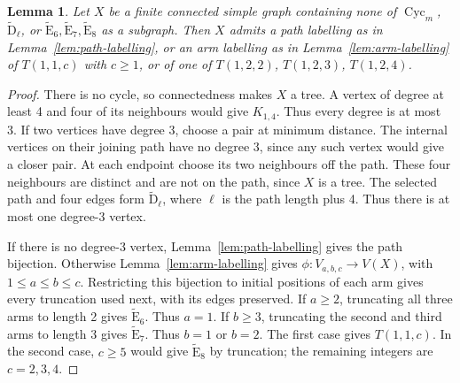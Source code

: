 \documentclass[11pt]{amsart}
\newcommand\opk[1]{\mathop{\mathrm{#1}}\nolimits}
\newtheorem{lemma}[theorem]{Lemma}
\theoremstyle{definition}
\newcommand{\typ}[1]{\mathrm{#1}}
\newcommand{\Cyc}{\opk{Cyc}}
\begin{document}
\begin{lemma}\label{lem:unweighted-trees}
Let $X$ be a finite connected simple graph containing none of
$\Cyc_m$, $\widetilde{\typ D}_\ell$, or
$\widetilde{\typ E}_6,\widetilde{\typ E}_7,\widetilde{\typ E}_8$ as a
subgraph. Then $X$ admits a path labelling as in
Lemma~\ref{lem:path-labelling}, or an arm labelling as in
Lemma~\ref{lem:arm-labelling} of $T(1,1,c)$ with $c\geq1$, or of
one of $T(1,2,2)$, $T(1,2,3)$, $T(1,2,4)$.
\end{lemma}
\begin{proof}
There is no cycle, so connectedness makes $X$ a tree. A vertex of degree
at least 4 and four of its neighbours would give $K_{1,4}$. Thus every
degree is at most 3. If two vertices have degree 3, choose a pair at
minimum distance. The internal vertices on their joining path have no
degree 3, since any such vertex would give a closer pair. At each endpoint
choose its two neighbours off the path. These four neighbours are distinct
and are not on the path, since $X$ is a tree. The selected path and four
edges form $\widetilde{\typ D}_\ell$, where $\ell$ is the path length
plus 4. Thus there is at most one degree-3 vertex.

If there is no degree-3 vertex, Lemma~\ref{lem:path-labelling} gives
the path bijection. Otherwise Lemma~\ref{lem:arm-labelling} gives
$\phi:V_{a,b,c}\to V(X)$, with $1\leq a\leq b\leq c$.
Restricting this bijection to initial positions of each arm gives every
truncation used next, with its edges preserved.
If $a\geq2$, truncating all three arms to length 2 gives
$\widetilde{\typ E}_6$. Thus $a=1$. If $b\geq3$, truncating the
second and third arms to length 3 gives $\widetilde{\typ E}_7$.
Thus $b=1$ or $b=2$. The first case gives $T(1,1,c)$.
In the second case, $c\geq5$ would give $\widetilde{\typ E}_8$ by
truncation; the remaining integers are $c=2,3,4$.
\end{proof}
\end{document}
